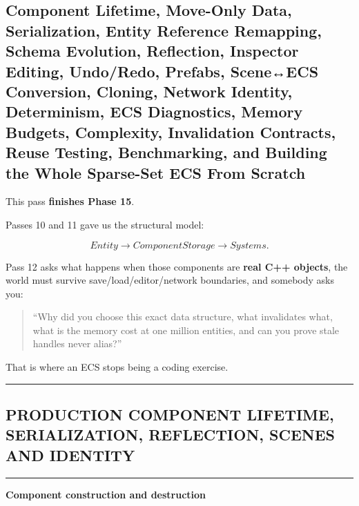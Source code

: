 \subsection{Component Lifetime, Move-Only Data, Serialization, Entity Reference Remapping, Schema Evolution, Reflection, Inspector Editing, Undo/Redo, Prefabs, Scene↔ECS Conversion, Cloning, Network Identity, Determinism, ECS Diagnostics, Memory Budgets, Complexity, Invalidation Contracts, Reuse Testing, Benchmarking, and Building the Whole Sparse-Set ECS From Scratch}\label{05-engine-i-ch017-component-lifetime-move-only-data-serialization-entity-reference-remapping-schema-evolution-reflection-inspector-editing-undoredo-prefabs-sceneecs-conversion-cloning-network-identity-determinism-ecs-diagnostics-memory-budgets-complexity-invalidation-contracts-reuse-testing-benchmarking-and-building-the-whole-sparse-set-ecs-from-scratch}

This pass \textbf{finishes Phase 15}.

Passes 10 and 11 gave us the structural model:

\[
Entity
\rightarrow
ComponentStorage
\rightarrow
Systems.
\]

Pass 12 asks what happens when those components are \textbf{real C++ objects}, the world must survive save/load/editor/network boundaries, and somebody asks you:

\begin{quote}
``Why did you choose this exact data structure, what invalidates what, what is the memory cost at one million entities, and can you prove stale handles never alias?''
\end{quote}

That is where an ECS stops being a coding exercise.

\begin{center}\rule{0.5\linewidth}{0.5pt}\end{center}

\subsection{PRODUCTION COMPONENT LIFETIME, SERIALIZATION, REFLECTION, SCENES AND IDENTITY}\label{05-engine-i-ch017-production-component-lifetime-serialization-reflection-scenes-and-identity}

\begin{center}\rule{0.5\linewidth}{0.5pt}\end{center}

\textbf{Component construction and destruction}

